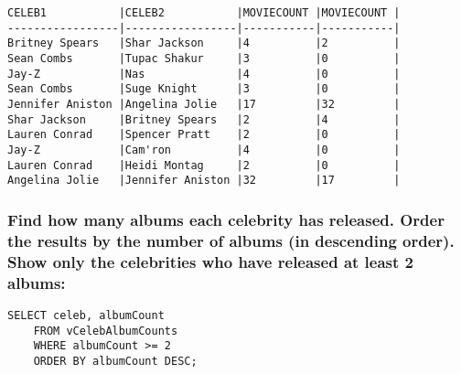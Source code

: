 \documentclass{article}
\begin{document}
        \begin{verbatim}
CELEB1           |CELEB2           |MOVIECOUNT |MOVIECOUNT |
-----------------|-----------------|-----------|-----------|
Britney Spears   |Shar Jackson     |4          |2          |
Sean Combs       |Tupac Shakur     |3          |0          |
Jay-Z            |Nas              |4          |0          |
Sean Combs       |Suge Knight      |3          |0          |
Jennifer Aniston |Angelina Jolie   |17         |32         |
Shar Jackson     |Britney Spears   |2          |4          |
Lauren Conrad    |Spencer Pratt    |2          |0          |
Jay-Z            |Cam'ron          |4          |0          |
Lauren Conrad    |Heidi Montag     |2          |0          |
Angelina Jolie   |Jennifer Aniston |32         |17         |
        \end{verbatim}
        
        
        \subsubsection*{Find how many albums each celebrity has released. Order the results by the number
of albums (in descending order). Show only the celebrities who have released at least
2 albums:}
        \begin{verbatim}
SELECT celeb, albumCount
    FROM vCelebAlbumCounts
    WHERE albumCount >= 2
    ORDER BY albumCount DESC;\end{verbatim}
    
\end{document}
